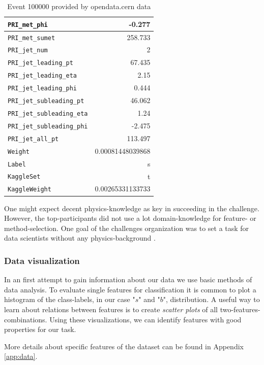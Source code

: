 \begin{table}
\begin{center}
\begin{tabular}{|l|r|}
		\hline
		\texttt{PRI\_met\_phi} & -0.277 \\
		\hline
		\texttt{PRI\_met\_sumet} & 258.733 \\
		\hline
		\texttt{PRI\_jet\_num} & 2 \\
		\hline
		\texttt{PRI\_jet\_leading\_pt} & 67.435 \\
		\hline
		\texttt{PRI\_jet\_leading\_eta} & 2.15 \\
		\hline
		\texttt{PRI\_jet\_leading\_phi} & 0.444 \\
		\hline
		\texttt{PRI\_jet\_subleading\_pt} & 46.062 \\
		\hline
		\texttt{PRI\_jet\_subleading\_eta} & 1.24 \\
		\hline
		\texttt{PRI\_jet\_subleading\_phi} & -2.475 \\
		\hline
		\texttt{PRI\_jet\_all\_pt} & 113.497 \\
		\hline
		\texttt{Weight} & 0.00081448039868 \\
		\hline
		\texttt{Label} & s \\
		\hline
		\texttt{KaggleSet} & t \\
		\hline
		\texttt{KaggleWeight} & 0.00265331133733 \\
		\hline	
	\end{tabular}
\end{center}
\caption{Event 100000 provided by opendata.cern data\cite{higgsData}}
\label{tab:data}
\end{table}

One might expect decent physics-knowledge as key in succeeding in the challenge. However, the top-participants did not use a lot domain-knowledge for feature- or method-selection. One goal of the challenges organization was to set a task for data scientists without any physics-background \cite{higgsPaper}.

\subsubsection{Data visualization}
In an first attempt to gain information about our data we use basic methods of data analysis.
To evaluate single features for classification it is common to plot a histogram of the class-labels, in our case "$s$" and "$b$", distribution. A useful way to learn about relations between features is to create \emph{scatter plots} of all two-features-combinations.
Using these visualizations, we can identify features with good properties for our task.

More details about specific features of the dataset can be found in Appendix \ref{app:data}.

